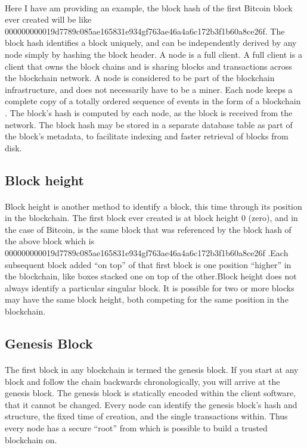\paragraph{}Here I have am providing an example, the block hash of the first Bitcoin block ever created will be like 000000000019d7789c085ae165831e934gf763ae46a4a6c172b3f1b60a8ce26f. The block hash identifies a block uniquely, and can be independently derived by any node simply by hashing the block header. A node is a full client. A full client is a client that owns the block chains and is sharing blocks and transactions across the blockchain network. A node is considered to be part of the blockchain infrastructure, and does not necessarily have to be a miner. Each node keeps a complete copy of a totally ordered sequence of events in the form of a blockchain . The block’s hash is computed by each node, as the block is received from the network. The block hash may be stored in a separate database table as part of the block’s metadata, to facilitate indexing and faster retrieval of blocks from disk.

\subsection{Block height}

\paragraph{}Block height is another method to identify a block, this time through its position in the blockchain. The first block ever created is at block height 0 (zero), and in the case of Bitcoin, is the same block that was referenced by the block hash of the above block which is 000000000019d7789c085ae165831e934gf763ae46a4a6c172b3f1b60a8ce26f .Each subsequent block added “on top” of that first block is one position “higher” in the blockchain, like boxes stacked one on top of the other.Block height does not always identify a particular singular block. It is possible for two or more blocks may have the same block height, both competing for the same position in the blockchain.

\subsection{Genesis Block}

\paragraph{}The first block in any blockchain is termed the genesis block. If you start at any block and follow the chain backwards chronologically, you will arrive at the genesis block. The genesis block is statically encoded within the client software, that it cannot be changed. Every node can identify the genesis block’s hash and structure, the fixed time of creation, and the single transactions within. Thus every node has a secure “root” from which is possible to build a trusted blockchain on.

